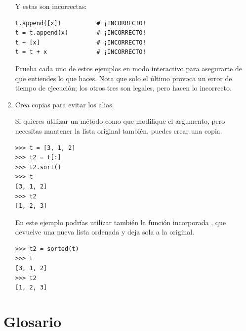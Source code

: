 \begin{enumerate}
Y estas son incorrectas:

\begin{Verbatim}[frame=single]
t.append([x])          # ¡INCORRECTO!
t = t.append(x)        # ¡INCORRECTO!
t + [x]                # ¡INCORRECTO!
t = t + x              # ¡INCORRECTO!
\end{Verbatim}

Prueba cada uno de estos ejemplos en modo interactivo para asegurarte
de que entiendes lo que haces.  Nota que solo el último
provoca un error de tiempo de ejecución; los otros tres son legales, pero
hacen lo incorrecto.


\item Crea copias para evitar los alias.

Si quieres utilizar un método como  que modifique
el argumento, pero necesitas mantener la lista original
también, puedes crear una copia.

\begin{Verbatim}[frame=single]
>>> t = [3, 1, 2]
>>> t2 = t[:]
>>> t2.sort()
>>> t
[3, 1, 2]
>>> t2
[1, 2, 3]
\end{Verbatim}

En este ejemplo podrías utilizar también la función incorporada ,
que devuelve una nueva lista ordenada y deja sola a la original.

\begin{Verbatim}[frame=single]
>>> t2 = sorted(t)
>>> t
[3, 1, 2]
>>> t2
[1, 2, 3]
\end{Verbatim}

\end{enumerate}



\section{Glosario}

